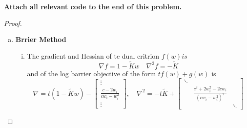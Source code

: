\documentclass{article}
\theoremstyle{remark}
\theoremstyle{definition}
\begin{document}
\textbf{Attach all relevant code to the end of this problem.}
\begin{proof}
\begin{enumerate}[(a)]
    \item \textbf{Brrier Method}
    \begin{enumerate}[(i)]
        \item The gradient and Hessian of te dual critrion $f(w) is $\[\nabla f= 1-\widetilde{K}w\quad \nabla^2 f = -\widetilde{K}\]
        and of the log barrier objective of the form $tf(w)+g(w)$ is 
        \[\nabla =t(1-\widetilde{K}w)-
        \begin{bmatrix}
        \vdots\\
        \frac{c-2w_i}{cw_i-w_i^2}\\
        \vdots
        \end{bmatrix}, \quad 
        \nabla^2 = -t\widetilde{K}+
        \begin{bmatrix}
        \ddots & &\\
        & \frac{c^2+2w_i^2-2cw_i}{(cw_i-w_i^2)^2}&\\
        && \ddots
        \end{bmatrix}\]
        

\end{enumerate}
\end{enumerate}
\end{proof}
\end{document}
